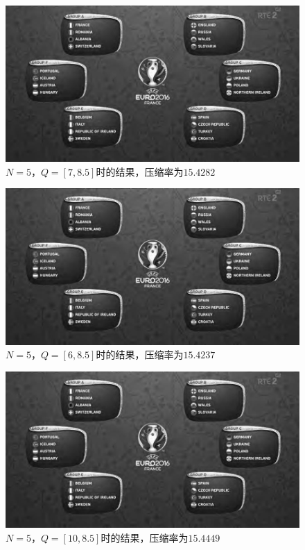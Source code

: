 \documentclass[UTF8]{ctexart}
\begin{document}
             			\begin{figure}[H]
             				\centering 
             				\includegraphics[scale=0.4]{n_5_q_7_8-5.jpg} 
             				\caption{$N = 5$，$Q = [7, 8.5]$时的结果，压缩率为$15.4282$} 
             				\label{n=5, Q=[7,8.5]}
             			\end{figure}  
                         
             			\begin{figure}[H]
             				\centering 
             				\includegraphics[scale=0.4]{n_5_q_6_8-5.jpg} 
             				\caption{$N = 5$，$Q = [6, 8.5]$时的结果，压缩率为$15.4237$} 
             				\label{n=5, Q=[6,8.5]}
             			\end{figure} 
                         
             			\begin{figure}[H]
             				\centering 
             				\includegraphics[scale=0.4]{n_5_q_10_8-5.jpg} 
             				\caption{$N = 5$，$Q = [10, 8.5]$时的结果，压缩率为$15.4449$} 
             				\label{n=5, Q=[10,8.5]}
             			\end{figure}                                                                                   
                        
\end{document}
